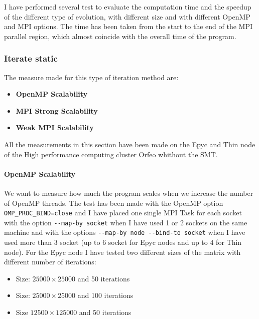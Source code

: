 \documentclass[
  letterpaper,
  DIV=11,
  numbers=noendperiod]{scrartcl}
\let\oldparagraph\paragraph
\renewcommand{\paragraph}[1]{\oldparagraph{#1}\mbox{}}
\providecommand{\tightlist}{%
  \setlength{\itemsep}{0pt}\setlength{\parskip}{0pt}}\usepackage{longtable,booktabs,array}
\begin{document}
I have performed several test to evaluate the computation time and the
speedup of the different type of evolution, with different size and with
different OpenMP and MPI options. The time has been taken from the start
to the end of the MPI parallel region, which almost coincide with the
overall time of the program.

\hypertarget{iterate-static}{%
\subsubsection{Iterate static}\label{iterate-static}}

The measure made for this type of iteration method are:

\begin{itemize}
\tightlist
\item
  \textbf{OpenMP Scalability}
\item
  \textbf{MPI Strong Scalability}
\item
  \textbf{Weak MPI Scalability}
\end{itemize}

All the measurements in this section have been made on the Epyc and Thin
node of the High performance computing cluster Orfeo whithout the SMT.

\hypertarget{openmp-scalability}{%
\paragraph{OpenMP Scalability}\label{openmp-scalability}}

We want to measure how much the program scales when we increase the
number of OpenMP threads. The test has been made with the OpenMP option
\texttt{OMP\_PROC\_BIND=close} and I have placed one single MPI Task for
each socket with the option \texttt{-\/-map-by\ socket} when I have used
1 or 2 sockets on the same machine and with the options
\texttt{-\/-map-by\ node\ -\/-bind-to\ socket} when I have used more
than 3 socket (up to 6 socket for Epyc nodes and up to 4 for Thin node).
For the Epyc node I have tested two different sizes of the matrix with
different number of iterations:

\begin{itemize}
\tightlist
\item
  Size: \(25000\times 25000\) and 50 iterations
\item
  Size: \(25000\times 25000\) and 100 iterations
\item
  Size \(12500\times 125000\) and 50 iterations
\end{itemize}
\end{document}
